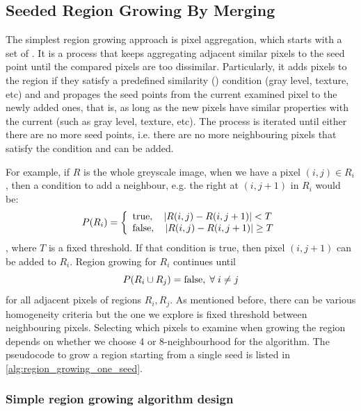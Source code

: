 \documentclass[a4paper]{article}
\begin{document}
\subsection{Seeded Region Growing By Merging}
The simplest region growing approach is pixel aggregation, which starts with a set of . It is a  process that keeps aggregating adjacent similar pixels to the seed point until the compared pixels are too dissimilar. Particularly, it adds pixels to the region if they satisfy a predefined similarity () condition (gray level, texture, etc) and and propages the seed points from the current examined pixel to the newly added ones, that is, as long as the new pixels have similar properties with the current (such as gray level, texture, etc). The process is iterated until either there are no more seed points, i.e. there are no more neighbouring pixels that satisfy the condition and can be added.

For example, if $R$ is the whole greyscale image, when we have a pixel $(i,j) \in R_i$, then a condition to add a neighbour, e.g. the right at $(i,j+1)$ in $R_i$ would be:
\begin{equation}
P(R_i)= \left\{
\begin{array}{ll}
      \textup{true}, \quad \left| R(i,j) - R(i,j+1)\right| < T\\
      \textup{false}, \quad \left| R(i,j) - R(i,j+1)\right| \geq T  \\
\end{array} 
\right. 
\end{equation}
, where $T$ is a fixed threshold. If that condition is true, then pixel $(i,j+1)$ can be added to $R_i$. Region growing for $R_i$ continues until
\begin{equation}
    P(R_i \cup R_j) = \textup{false}, \; \forall \; i\neq j
\end{equation}
for all adjacent pixels of regions $R_i, R_j$. As mentioned before, there can be various homogeneity criteria but the one we explore is fixed threshold between neighbouring pixels. Selecting which pixels to examine when growing the region depends on whether we choose 4 or 8-neighbourhood for the algorithm. The pseudocode to grow a region starting from a single seed is listed in \ref{alg:region_growing_one_seed}.



\subsubsection{Simple region growing algorithm design}
\end{document}

